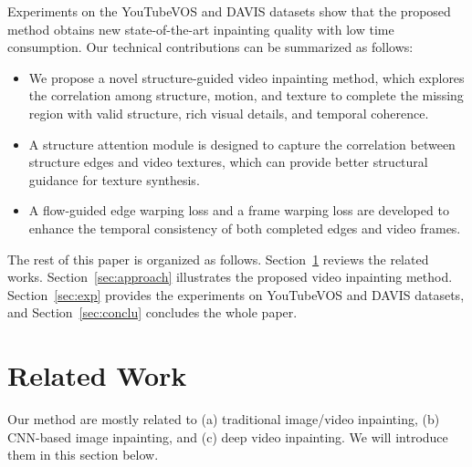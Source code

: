 %
Experiments on the YouTubeVOS and DAVIS datasets show that the proposed method obtains new state-of-the-art inpainting quality with low time consumption.
%
Our technical contributions can be summarized as follows:
\begin{itemize}
	\item We propose a novel structure-guided video inpainting method, which explores the correlation among structure, motion, and texture to complete the missing region with valid structure, rich visual details, and temporal coherence.	
	\item A structure attention module is designed to capture the correlation between structure edges and video textures, which can provide better structural guidance for texture synthesis.
	\item A flow-guided edge warping loss and a frame warping loss are developed to enhance the temporal consistency of both completed edges and video frames.   
\end{itemize}


The rest of this paper is organized as follows. Section~\ref{sec:rw} reviews the related works. Section~\ref{sec:approach} illustrates the proposed video inpainting method. Section~\ref{sec:exp} provides the experiments on YouTubeVOS and DAVIS datasets, and Section~\ref{sec:conclu} concludes the whole paper.





\section{Related Work}\label{sec:rw}
Our method are mostly related to (a) traditional image/video inpainting, (b) CNN-based image inpainting, and (c) deep video inpainting. We will introduce them in this section below.
